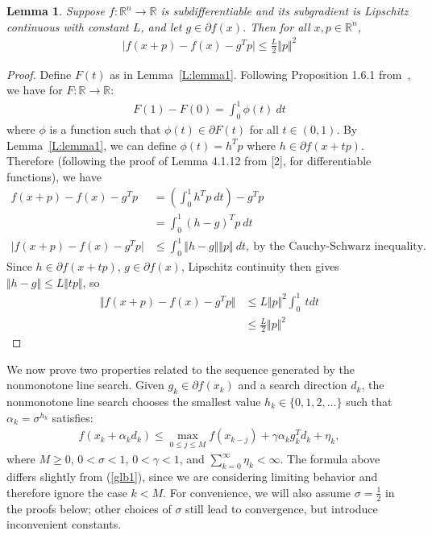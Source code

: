 \documentclass[]{interact}
\newcommand{\Real}{\mathbb{R}}
\theoremstyle{plain}%
\newtheorem{lemma}[theorem]{Lemma}
\theoremstyle{definition}
\theoremstyle{remark}
\begin{document}
\begin{lemma}\label{L:lemma2}
Suppose $f: \mathbb{R}^n \to \mathbb{R}$ is subdifferentiable and its subgradient is Lipschitz continuous with constant $L$, and let $g \in \partial f(x)$. Then for all $x,p \in \mathbb{R}^n$,
\begin{align*}
\vert f(x+p) - f(x) - g^T p \vert \leq \frac{L}{2} \Vert p \Vert^2
\end{align*}
\end{lemma}
\begin{proof}  Define $F(t)$ as in Lemma~\ref{L:lemma1}. Following Proposition 1.6.1 from~\cite{Niculescu}, we have for $F:\Real \to \Real$:
\begin{align*}
F(1) - F(0) = \int_0^1  \phi(t) \: dt
\end{align*}
where $\phi$ is a function such that $\phi(t) \in \partial F (t)$ for all $t \in (0,1)$. By Lemma~\ref{L:lemma1}, we can define $\phi(t) = h^T p$ where $h \in \partial f(x+tp)$. Therefore (following the proof of Lemma 4.1.12 from [2], for differentiable functions), we have
\begin{align*}
f(x+p) - f(x) - g^Tp &= \left(\int_0^1 h^Tp \: dt\right) - g^Tp \\
&= \int_0^1 (h-g)^T p \: dt \\
\vert f(x+p) - f(x) - g^T p \vert &\leq \int_0^1 \Vert h - g \Vert \Vert p \Vert \: dt, ~\text{by the Cauchy-Schwarz inequality.}
\end{align*}
Since $h \in \partial f(x+tp)$, $g \in \partial f(x)$, Lipschitz continuity then gives $\Vert h - g \Vert \leq L \Vert tp \Vert$, so 
\begin{align*}
\Vert f(x+p) - f(x) - g^T p \Vert &\leq L \Vert p \Vert^2 \int_0^1 \: t dt\\
&\leq \frac{L}{2} \Vert p \Vert^2
\end{align*}
\end{proof}
We now prove two properties related to the sequence generated by the nonmonotone line search. Given $g_k \in \partial f(x_k)$ and a search direction $d_k$, the nonmonotone line search chooses the smallest value $h_k \in \{0,1,2,\dots\}$ such that $\alpha_k = \sigma^{h_k}$ satisfies:
\begin{align}
f(x_k + \alpha_k d_k ) \leq \max_{0 \leq j \leq M} f(x_{k-j}) + \gamma \alpha_k g_k^T d_k + \eta_k,
\end{align}
where $M \geq 0$, $0 < \sigma < 1$, $0 < \gamma < 1$, and $\sum_{k=0}^\infty \eta_k < \infty$. The formula above differs slightly from (\ref{glb1}), since we are considering limiting behavior and therefore ignore the case $k < M$. For convenience, we will also assume $\sigma = \frac{1}{2}$ in the proofs below; other choices of $\sigma$ still lead to convergence, but introduce inconvenient constants. 
\end{document}
